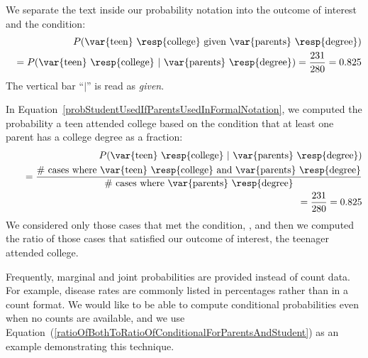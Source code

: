 We separate the text inside our probability notation into the outcome of interest and the condition:
\begin{eqnarray}
&& P(\text{\var{teen} \resp{college} given \var{parents} \resp{degree}}) \notag \\
&& = P(\text{\var{teen} \resp{college}}\ |\ \text{\var{parents} \resp{degree}}) = \frac{231}{280} = 0.825
\label{probStudentUsedIfParentsUsedInFormalNotation}
\end{eqnarray}
The vertical bar ``$|$'' is read as \emph{given}.

In Equation~\eqref{probStudentUsedIfParentsUsedInFormalNotation}, we computed the probability a teen attended college based on the condition that at least one parent has a college degree as a fraction:
\begin{eqnarray}
&& P(\text{\var{teen} \resp{college}}\ |\ \text{\var{parents} \resp{degree}}) \notag \\
&&\quad = \frac{\text{\# cases where \var{teen} \resp{college} and \var{parents} \resp{degree}}}{\text{\# cases where \var{parents} \resp{degree}}} \label{ratioOfBothToRatioOfConditionalForParentsAndStudent} \\
&&\quad = \frac{231}{280} = 0.825 \notag
\end{eqnarray}
We considered only those cases that met the condition,  , and then we computed the ratio of those cases that satisfied our outcome of interest, the teenager attended college.

Frequently, marginal and joint probabilities are provided instead of count data. For example, disease rates are commonly listed in percentages rather than in a count format. We would like to be able to compute conditional probabilities even when no counts are available, and we use Equation~(\ref{ratioOfBothToRatioOfConditionalForParentsAndStudent}) as an example demonstrating this technique.


